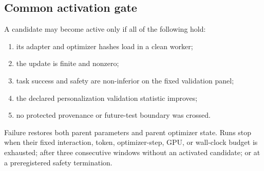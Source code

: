 \subsection{Common activation gate}
\label{sec:activation-gate}

A candidate may become active only if all of the following hold:
\begin{enumerate}
  \item its adapter and optimizer hashes load in a clean worker;
  \item the update is finite and nonzero;
  \item task success and safety are non-inferior on the fixed validation panel;
  \item the declared personalization validation statistic improves;
  \item no protected provenance or future-test boundary was crossed.
\end{enumerate}
Failure restores both parent parameters and parent optimizer state.  Runs stop
when their fixed interaction, token, optimizer-step, GPU, or wall-clock budget
is exhausted; after three consecutive windows without an activated candidate;
or at a preregistered safety termination.
